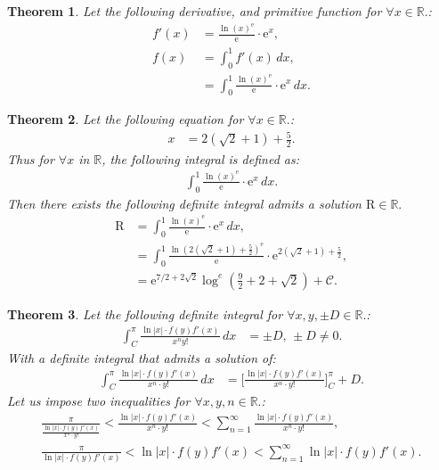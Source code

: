 \documentclass[10pt]{article}
\theoremstyle{plain}
\newtheorem{theorem}{Theorem}[section]
\theoremstyle{definition}
\theoremstyle{remark}
\begin{document}
\begin{theorem}
	Let the following derivative, and primitive function for $\forall x \in \mathbb{R}.$:
	\begin{align*}
		f'(x)&= \frac{\ln (x)^{\mathrm{e}}}{\mathrm{e}} \cdot \mathrm{e}^{x},\\
		f(x) &= \int_{0}^{1} f'(x)\, dx,\\
		&= \int_{0}^{1} \frac{\ln (x)^{\mathrm{e}}}{\mathrm{e}} \cdot \mathrm{e}^{x} \, dx.
	\end{align*}
\end{theorem}

\begin{theorem}
	Let the following equation for $\forall x \in \mathbb{R}.$:
	\begin{align*}
		x &= 2(\sqrt{2} + 1) + \frac{5}{2}.
	\end{align*}
	Thus for $\forall x$ in $\mathbb{R}$, the following integral is defined as:
	\begin{align*}
		\int_{0}^{1} \frac{\ln (x)^{\mathrm{e}}}{\mathrm{e}} \cdot \mathrm{e}^{x} \, dx.
	\end{align*}
	Then there exists the following definite integral admits a solution $\mathrm{R} \in \mathbb{R}.$
	\begin{align*}
		\mathrm{R} &= \int_{0}^{1} \frac{\ln (x)^{\mathrm{e}}}{\mathrm{e}} \cdot \mathrm{e}^{x} \, dx,\\
		&= \int_{0}^{1} \frac{\ln (2(\sqrt{2} + 1) + \frac{5}{2})^{\mathrm{e}}}{\mathrm{e}} \cdot \mathrm{e}^{2(\sqrt{2} + 1) + \frac{5}{2}},\\
		&= \mathrm{e}^{7/2+2 \sqrt{2}} \log^{e}(\frac{9}{2}+2+\sqrt{2}) + \mathcal{C}.
	\end{align*}
\end{theorem}

\begin{theorem}
	\label{theo:2.31}
	Let the following definite integral for $\forall x, y, \pm D \in \mathbb{R}.$:
	\begin{align*}
		\int_{C}^{\pi} \frac{ \ln |x| \cdot f(y)f'(x) }{x^{n}y!} \, dx &= \pm D, \, \pm D \neq 0.
	\end{align*}
	With a definite integral that admits a solution of:
	\begin{align*}
		\int_{C}^{\pi} \frac{ \ln |x| \cdot f(y)f'(x) }{x^{n} \cdot y!} \, dx &= \big[\frac{ \ln |x| \cdot f(y)f'(x) }{x^{n} \cdot y!}\big]_{C}^{\pi} + D.
	\end{align*}
	Let us impose two inequalities for $\forall x, y, n \in \mathbb{R}.$:
	\begin{align*}
		\frac{\pi}{\frac{ \ln |x| \cdot f(y)f'(x) }{x^{n} \cdot  y!}} < \frac{ \ln |x| \cdot f(y)f'(x) }{x^{n} \cdot y!} < \sum_{n=1}^{\infty} \frac{ \ln |x| \cdot f(y)f'(x) }{x^{n} \cdot y!},\\
	\frac{\pi}{\ln |x| \cdot f(y)f'(x) } < \ln |x| \cdot f(y)f'(x)  < \sum_{n=1}^{\infty} \ln |x| \cdot f(y)f'(x).
	\end{align*}
\end{theorem}
\end{document}
